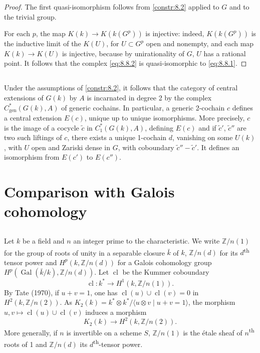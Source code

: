 \documentclass[11pt,a4paper]{article}
\theoremstyle{plain}
\theoremstyle{definition}
\DeclareMathOperator{\Gal}{Gal}
\DeclareMathOperator{\cl}{cl}
\DeclareMathOperator{\gen}{gen}
\newcommand{\bZ}{\mathbb{Z}}
\begin{document}
\begin{proof}
The first quasi-isomorphism follows from \ref{constr:8.2} applied to $G$ and to the trivial group.

For each $p$, the map $K(k) \to K(k(G^p))$ is injective: indeed, $K(k(G^p))$ is the inductive limit of the $K(U)$, for $U \subset G^p$ open and nonempty, and each map $K(k) \to K(U)$ is injective, because by unirationality of $G$, $U$ has a rational point. It follows that the complex \eqref{eq:8.8.2} is quasi-isomorphic to \eqref{eq:8.8.1}.
\end{proof}

\subsection{}
Under the assumptions of \ref{constr:8.2}, it follows that the category of central extensions of $G(k)$ by $A$ is incarnated in degree 2 by the complex $C^*_{\gen}(G(k), A)$ of generic cochains. In particular, a generic 2-cochain $c$ defines a central extension $E(c)$, unique up to unique isomorphisms. More precisely, $c$ is the image of a cocycle $\tilde{c}$ in $C^*_1(G(k), A)$, defining $E(c)$ and if $\tilde{c}'$, $\tilde{c}''$ are two such liftings of $c$, there exists a unique 1-cochain $d$, vanishing on some $U(k)$, with $U$ open and Zariski dense in $G$, with coboundary $\tilde{c}'' - \tilde{c}'$. It defines an isomorphism from $E(c')$ to $E(c'')$.

\section{Comparison with Galois cohomology}

\subsection{}
Let $k$ be a field and $n$ an integer prime to the characteristic. We write $\bZ/n(1)$ for the group of roots of unity in a separable closure $\bar{k}$ of $k$, $\bZ/n(d)$ for its $d$\textsuperscript{th} tensor power and $H^p(k, \bZ/n(d))$ for a Galois cohomology group $H^p(\Gal(\bar{k}/k), \bZ/n(d))$. Let $\cl$ be the Kummer coboundary
\[\cl: k^* \to H^1(k, \bZ/n(1)).\]
By Tate (1970), if $u+v=1$, one has $\cl(u) \cup \cl(v) = 0$ in $H^2(k, \bZ/n(2))$. As $K_2(k) = k^* \otimes k^*/\langle u \otimes v \mid u+v=1 \rangle$, the morphism $u, v \mapsto \cl(u) \cup \cl(v)$ induces a morphism
\begin{equation}\label{eq:9.1.1}
K_2(k) \to H^2(k, \bZ/n(2)).
\end{equation}
More generally, if $n$ is invertible on a scheme $S$, $\bZ/n(1)$ is the \'etale sheaf of $n$\textsuperscript{th} roots of 1 and $\bZ/n(d)$ its $d$\textsuperscript{th}-tensor power.
\end{document}
